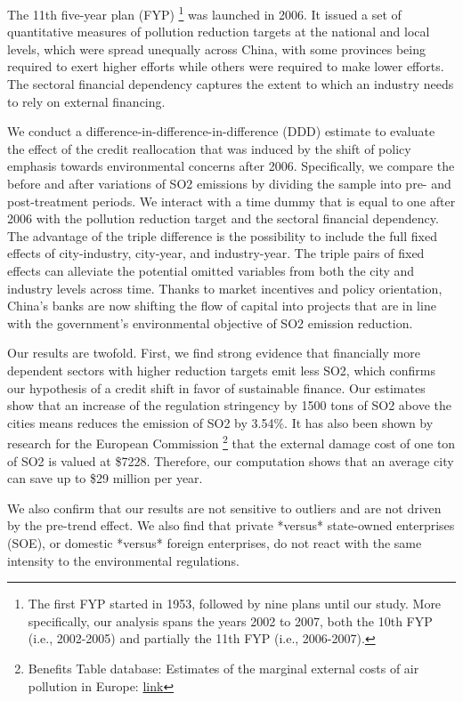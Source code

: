 \documentclass[12pt]{article}
\begin{document}
The 11th five-year plan (FYP) \footnote{The first FYP started in 1953, followed by nine plans until our study. More specifically, our analysis spans the  years 2002 to 2007, both the 10th FYP (i.e., 2002-2005) and partially the 11th FYP (i.e., 2006-2007).} was launched in 2006. It issued a set of quantitative measures of pollution reduction targets at the national and local levels, which were spread unequally across China, with some provinces being required to exert higher efforts while others were required to make lower efforts. The sectoral financial dependency captures the extent to which an industry needs to rely on external financing.

We conduct a difference-in-difference-in-difference (DDD) estimate to evaluate the effect of the credit reallocation that was induced by the shift of policy emphasis towards environmental concerns after 2006. Specifically, we compare the before and after variations of SO2 emissions by dividing the sample into pre- and post-treatment periods. We interact with a time dummy that is equal to one after 2006 with the pollution reduction target and the sectoral financial dependency. The advantage of the triple difference is the possibility to include the full fixed effects of city-industry, city-year, and industry-year. The triple pairs of fixed effects can alleviate the potential omitted variables from both the city and industry levels across time. Thanks to market incentives and policy orientation, China’s banks are now shifting the flow of capital into projects that are in line with the government's environmental objective of SO2 emission reduction.

Our results are twofold. First, we find strong evidence that financially more dependent sectors with higher reduction targets emit less SO2, which confirms our hypothesis of a credit shift in favor of sustainable finance. Our estimates show that an increase of the regulation stringency by 1500 tons of SO2 above the cities means reduces the emission of SO2 by 3.54\%. It has also been shown by research for the European Commission \footnote{Benefits Table database:
Estimates of the marginal external costs of air pollution in Europe: \href{https://ec.europa.eu/environment/enveco/air/pdf/betaec02a.pdf}{link}} that the external damage cost of one ton of SO2 is valued at \$7228. Therefore, our computation shows that an average city can save up to \$29 million per year.

We also confirm that our results are not sensitive to outliers and are not driven by the pre-trend effect. We also find that private *versus* state-owned enterprises (SOE), or domestic *versus* foreign enterprises, do not react with the same intensity to the environmental regulations.
\end{document}
